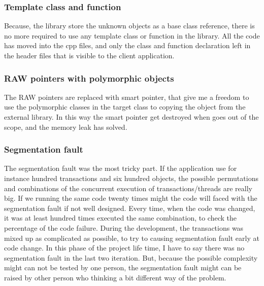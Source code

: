 \documentclass[12pt]{article}
\begin{document}
\subsubsection{Template class and function }
Because, the library store the unknown objects as a base class reference, there is no more required to use any template class or function in the library. All the code has moved into the cpp files, and only the class and function declaration left in the header files that is visible to the client application.

\subsubsection{RAW pointers with polymorphic objects}
The RAW pointers are replaced with smart pointer, that give me a freedom to use the polymorphic classes in the target class to copying the object from the external library. In this way the smart pointer get destroyed when goes out of the scope, and the memory leak has solved.

\subsubsection{Segmentation fault}
The segmentation fault was the most tricky part. If the application use for instance hundred transactions and six hundred objects, the possible permutations and combinations of the concurrent execution of transactions/threads are really big. If we running the same code twenty times might the code will faced with the segmentation fault if not well designed. Every time, when the code was changed, it was at least hundred times executed the same combination, to check the percentage of the code failure. During the development, the transactions was mixed up as complicated as possible, to try to causing segmentation fault early at code change. In this phase of the project life time, I have to say there was no segmentation fault in the last two iteration. But, because the possible complexity might can not be tested by one person, the segmentation fault might can be raised by other person who thinking a bit different way of the problem.\\   
   
\newpage
\end{document}

